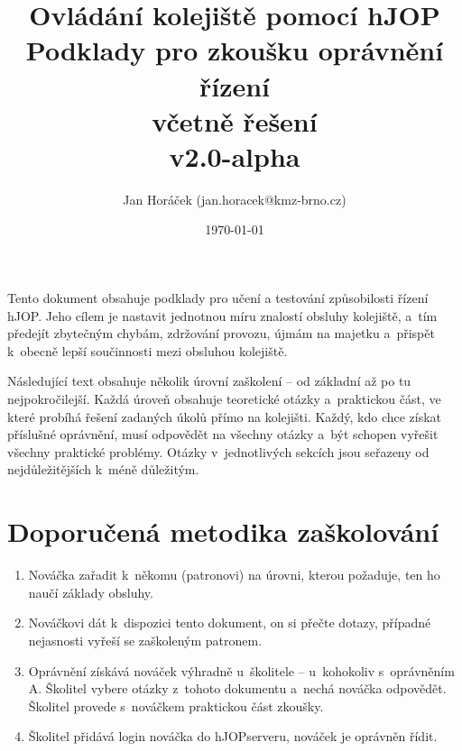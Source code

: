 \documentclass[12pt,a4paper]{article}
\begin{document}
\thispagestyle{empty}

\setlength{\parindent}{0cm}
\setlength{\parskip}{.4\baselineskip plus2pt minus1pt}
\setlength{\droptitle}{-5em}

\title{\bfseries
{\Large Ovládání kolejiště pomocí hJOP\\}
{\LARGE Podklady pro zkoušku oprávnění řízení\\}
\ifsolution
{\Large \color{gray}včetně řešení\\}
\fi
{\small v2.0-alpha}}
\author{Jan Horáček (jan.horacek@kmz-brno.cz)}
\date{\today}
\maketitle

Tento dokument obsahuje podklady pro učení a testování způsobilosti řízení
hJOP. Jeho cílem je nastavit jednotnou míru znalostí obsluhy kolejiště, a~tím
předejít zbytečným chybám, zdržování provozu, újmám na majetku a~přispět
k~obecně lepší součinnosti mezi obsluhou kolejiště.

Následující text obsahuje několik úrovní zaškolení – od základní až po tu
nejpokročilejší. Každá úroveň obsahuje teoretické otázky a~praktickou část, ve
které probíhá řešení zadaných úkolů přímo na kolejišti. Každý, kdo chce získat
příslušné oprávnění, musí odpovědět na všechny otázky a~být schopen vyřešit
všechny praktické problémy. Otázky v~jednotlivých sekcích jsou seřazeny od
nejdůležitějších k~méně důležitým.

\section{Doporučená metodika zaškolování}

\begin{enumerate}[leftmargin=*]
\item Nováčka zařadit k~někomu (patronovi) na úrovni, kterou požaduje, ten ho
naučí základy obsluhy.
\item Nováčkovi dát k~dispozici tento dokument, on si přečte dotazy, případné
nejasnosti vyřeší se zaškoleným patronem.
\item Oprávnění získává nováček výhradně u~školitele – u~kohokoliv s~oprávněním
A.
Školitel vybere otázky z~tohoto dokumentu a~nechá nováčka odpovědět. Školitel
provede s~no\-váč\-kem praktickou část zkoušky.
\item Školitel přidává login nováčka do hJOPserveru, nováček je oprávněn řídit.
\end{enumerate}
\end{document}
